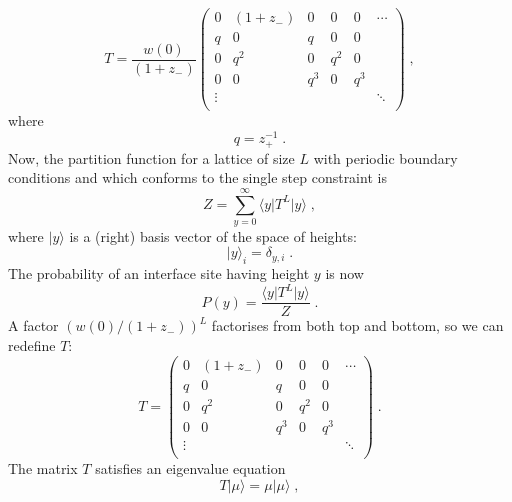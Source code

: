 \documentclass[a4paper,10pt]{article}
\newcommand{\bra}[1]{\langle #1 \vert}
\newcommand{\ket}[1]{\vert #1 \rangle}
\newcommand{\py}{P(y)}
\newcommand{\wzero}{w(0)}
\begin{document}
\begin{equation}
  T = \frac{\wzero}{(1+z_-)}
      \begin{pmatrix}
       0      & (1+z_-)& 0      & 0      & 0      & \cdots \\
       q      & 0      & q      & 0      & 0      &        \\
       0      & q^2    & 0      & q^2    & 0      &        \\
       0      & 0      & q^3    & 0      & q^3    &        \\
       \vdots &        &        &        &        & \ddots \\
      \end{pmatrix} \;,
\end{equation}
where 
\begin{equation}
  q = z_+^{-1} \;.
\end{equation}
Now, the partition function for  a lattice of size $L$ with periodic boundary conditions and which conforms to the single step constraint is
\begin{equation}
  Z = \sum_{y=0}^\infty \bra{y} T^L \ket{y} \;,
\end{equation}
where $\ket{y}$ is a (right) basis vector of the space of heights:
\begin{equation}
  \ket{y}_i = \delta_{y,i} \;.
\end{equation}
The probability of an interface site having height $y$ is now 
\begin{equation}
  \py = \frac{\bra{y} T^L \ket{y}}{Z} \;.
\end{equation}
A factor $(\wzero/(1+z_-))^L$ factorises from both top and bottom, so we can redefine $T$:
\begin{equation}\label{eq:T}
  T = \begin{pmatrix}
       0      & (1+z_-)& 0      & 0      & 0      & \cdots \\
       q      & 0      & q      & 0      & 0      &        \\
       0      & q^2    & 0      & q^2    & 0      &        \\
       0      & 0      & q^3    & 0      & q^3    &        \\
       \vdots &        &        &        &        & \ddots \\
      \end{pmatrix} \;.
\end{equation}
The matrix $T$ satisfies an eigenvalue equation
\begin{equation}
  T \ket{\mu} = \mu \ket{\mu} \;,
\end{equation}
\end{document}
